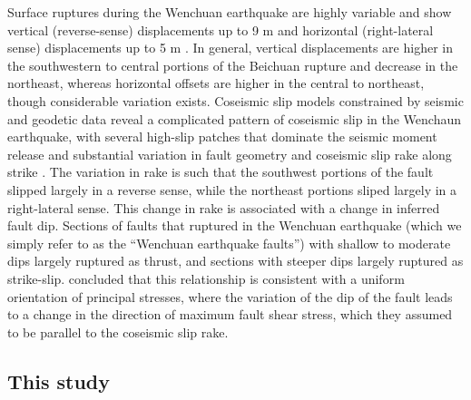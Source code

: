 \documentclass[draft,jgrga]{AGUTeX}
\begin{document}
\begin{article}

Surface ruptures during the Wenchuan earthquake are highly variable and show
vertical (reverse-sense) displacements up to 9 m and horizontal (right-lateral
sense) displacements up to 5 m \citep{lin2009, liu2009, xu2009}. In general,
vertical displacements are higher in the southwestern to central portions of
the Beichuan rupture and decrease in the northeast, whereas horizontal offsets
are higher in the central to northeast, though considerable variation exists.
Coseismic slip models constrained by seismic and geodetic data reveal a
complicated pattern of coseismic slip in the Wenchaun earthquake, with several
high-slip patches that dominate the seismic moment release and substantial
variation in fault geometry and coseismic slip rake along strike 
\citep[e.g.,][]{nakamura2010,
shen2009, tong2010, feng2010, zhang2011, qi2011, fielding2013}.  The variation
in rake is such that the southwest portions of the fault slipped largely in a
reverse sense, while the northeast portions sliped largely in a right-lateral
sense. This change in rake is associated with a change in inferred fault dip.
Sections of faults that ruptured in the Wenchuan earthquake (which we simply
refer to as the ``Wenchuan earthquake faults'') with shallow to moderate dips
largely ruptured as thrust, and sections with steeper dips largely ruptured as
strike-slip.  \citet{medinaluna2013} concluded that this relationship is
consistent with a uniform orientation of principal stresses, where the
variation of the dip of the fault leads to a change in the direction of maximum
fault shear stress, which they assumed to be parallel to the coseismic slip
rake.

\subsection{This study}\label{this-study}


\end{article}
\end{document}
